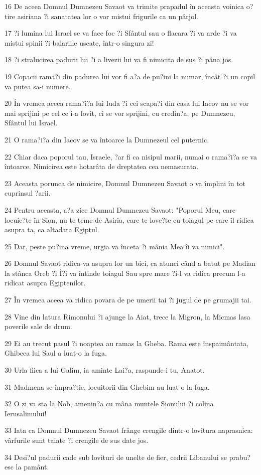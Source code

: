 \par 16 De aceea Domnul Dumnezeu Savaot va trimite prapadul în aceasta voinica o?tire asiriana ?i sanatatea lor o vor mistui frigurile ca un pârjol.
\par 17 ?i lumina lui Israel se va face foc ?i Sfântul sau o flacara ?i va arde ?i va mistui spinii ?i balariile uscate, într-o singura zi!
\par 18 ?i stralucirea padurii lui ?i a livezii lui va fi nimicita de sus ?i pâna jos.
\par 19 Copacii rama?i din padurea lui vor fi a?a de pu?ini la numar, încât ?i un copil va putea sa-i numere.
\par 20 În vremea aceea rama?i?a lui Iuda ?i cei scapa?i din casa lui Iacov nu se vor mai sprijini pe cel ce i-a lovit, ci se vor sprijini, cu credin?a, pe Dumnezeu, Sfântul lui Israel.
\par 21 O rama?i?a din Iacov se va întoarce la Dumnezeul cel puternic.
\par 22 Chiar daca poporul tau, Israele, ?ar fi ca nisipul marii, numai o rama?i?a se va întoarce. Nimicirea este hotarâta de dreptatea cea nemasurata.
\par 23 Aceasta porunca de nimicire, Domnul Dumnezeu Savaot o va împlini în tot cuprinsul ?arii.
\par 24 Pentru aceasta, a?a zice Domnul Dumnezeu Savaot: "Poporul Meu, care locuie?te în Sion, nu te teme de Asiria, care te love?te cu toiagul pe care îl ridica asupra ta, ca altadata Egiptul.
\par 25 Dar, peste pu?ina vreme, urgia va înceta ?i mânia Mea îi va nimici".
\par 26 Domnul Savaot ridica-va asupra lor un bici, ca atunci când a batut pe Madian la stânca Oreb ?i Î?i va întinde toiagul Sau spre mare ?i-l va ridica precum l-a ridicat asupra Egiptenilor.
\par 27 În vremea aceea va ridica povara de pe umerii tai ?i jugul de pe grumajii tai.
\par 28 Vine din latura Rimonului ?i ajunge la Aiat, trece la Migron, la Micmas lasa poverile sale de drum.
\par 29 Ei au trecut pasul ?i noaptea au ramas la Gheba. Rama este înspaimântata, Ghibeea lui Saul a luat-o la fuga.
\par 30 Urla fiica a lui Galim, ia aminte Lai?a, raspunde-i tu, Anatot.
\par 31 Madmena se împra?tie, locuitorii din Ghebim au luat-o la fuga.
\par 32 O zi va sta la Nob, amenin?a cu mâna muntele Sionului ?i colina Ierusalimului!
\par 33 Iata ca Domnul Dumnezeu Savaot frânge crengile dintr-o lovitura naprasnica: vârfurile sunt taiate ?i crengile de sus date jos.
\par 34 Desi?ul padurii cade sub lovituri de unelte de fier, cedrii Libanului se prabu?esc la pamânt.


